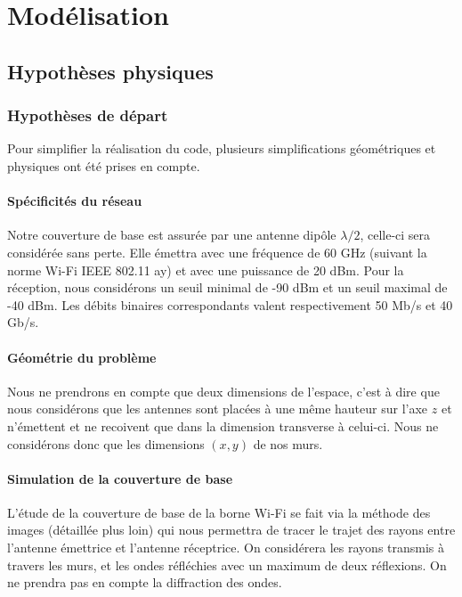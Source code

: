 \chapter{Modélisation}
\label{chapter-1}
\section{Hypothèses physiques}

\subsection{Hypoth{\`e}ses de d{\'e}part}

Pour simplifier la r{\'e}alisation du code, plusieurs simplifications
g{\'e}om{\'e}triques et physiques ont {\'e}t{\'e} prises en compte.

\subsubsection*{Sp{\'e}cificit{\'e}s du r{\'e}seau}

Notre couverture de base est assur{\'e}e par une antenne dip{\^o}le $\lambda /
2$, celle-ci sera consid{\'e}r{\'e}e sans perte. Elle {\'e}mettra avec une
fr{\'e}quence de 60 GHz (suivant la norme Wi-Fi IEEE 802.11 ay) et avec une
puissance de 20 dBm. Pour la r{\'e}ception, nous consid{\'e}rons un seuil
minimal de -90 dBm et un seuil maximal de -40 dBm. Les d{\'e}bits binaires
correspondants valent respectivement 50 Mb/s et 40 Gb/s.

\subsubsection*{G{\'e}om{\'e}trie du probl{\`e}me}

Nous ne prendrons en compte que deux dimensions de l'espace, c'est {\`a} dire
que nous consid{\'e}rons que les antennes sont plac{\'e}es {\`a} une m{\^e}me
hauteur sur l'axe $z$ et n'{\'e}mettent et ne recoivent que dans la dimension
transverse {\`a} celui-ci. Nous ne consid{\'e}rons donc
que les dimensions $(x, y)$ de nos murs.

\subsubsection*{Simulation de la couverture de base}

L'{\'e}tude de la couverture de base de la borne Wi-Fi se fait via la
m{\'e}thode des images (d{\'e}taill{\'e}e plus loin) qui nous permettra de
tracer le trajet des rayons entre l'antenne {\'e}mettrice et l'antenne
r{\'e}ceptrice. On consid{\'e}rera les rayons transmis {\`a} travers les
murs, et les ondes r{\'e}fl{\'e}chies avec un maximum de deux r{\'e}flexions.
On ne prendra pas en compte la diffraction des ondes.

